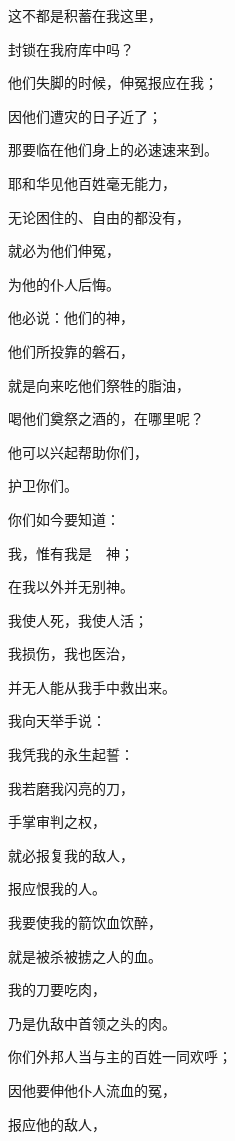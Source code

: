 {\par }{\BB \par }{\Q {}这不都是积蓄在我这里，
\par }{\Q 封锁在我府库中吗？
\par }{\Q {}他们失脚的时候，伸冤报应在我；
\par }{\Q 因他们遭灾的日子近了；
\par }{\Q 那要临在他们身上的必速速来到。
\par }{\Q {}耶和华见他百姓毫无能力，
\par }{\Q 无论困住的、自由的都没有{}，
\par }{\Q 就必为他们伸冤，
\par }{\Q 为他的仆人后悔。
\par }{\Q {}他必说：他们的神，
\par }{\Q 他们所投靠的磐石，
\par }{\Q {}就是向来吃他们祭牲的脂油，
\par }{\Q 喝他们奠祭之酒的，在哪里呢？
\par }{\Q 他可以兴起帮助你们，
\par }{\Q 护卫你们。
\par }{\BB \par }{\Q {}你们如今要知道：
\par }{\Q 我，惟有我是　神；
\par }{\Q 在我以外并无别神。
\par }{\Q 我使人死，我使人活；
\par }{\Q 我损伤，我也医治，
\par }{\Q 并无人能从我手中救出来。
\par }{\Q {}我向天举手说：
\par }{\Q 我凭我的永生起誓：
\par }{\Q {}我若磨我闪亮的刀，
\par }{\Q 手掌审判之权，
\par }{\Q 就必报复我的敌人，
\par }{\Q 报应恨我的人。
\par }{\Q {}我要使我的箭饮血饮醉，
\par }{\Q 就是被杀被掳之人的血。
\par }{\Q 我的刀要吃肉，
\par }{\Q 乃是仇敌中首领之头的肉。
\par }{\BB \par }{\Q {}你们外邦人当与主的百姓一同欢呼；
\par }{\Q 因他要伸他仆人流血的冤，
\par }{\Q 报应他的敌人，
}
